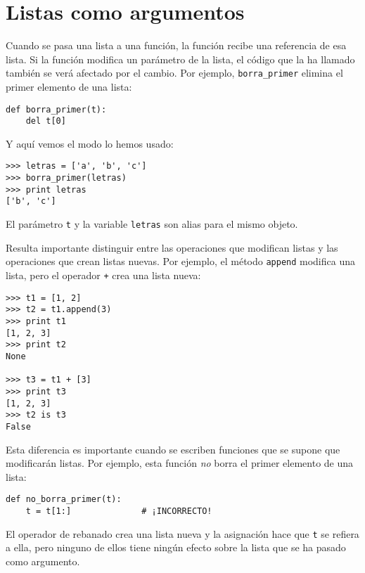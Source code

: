\section{Listas como argumentos}


Cuando se pasa una lista a una función, la función recibe una referencia
de esa lista.
Si la función modifica un parámetro de la lista, el código que la ha llamado también se verá afectado por el cambio.
Por ejemplo, \verb"borra_primer" elimina el primer elemento de una lista:

\beforeverb
\begin{verbatim}
def borra_primer(t):
    del t[0]
\end{verbatim}
\afterverb
%
Y aquí vemos el modo lo hemos usado:

\beforeverb
\begin{verbatim}
>>> letras = ['a', 'b', 'c']
>>> borra_primer(letras)
>>> print letras
['b', 'c']
\end{verbatim}
\afterverb
%
El parámetro {\tt t} y la variable {\tt letras} son
alias para el mismo objeto.

Resulta importante distinguir entre las operaciones que
modifican listas y las operaciones que crean listas nuevas.
Por ejemplo, el método {\tt append} modifica una lista, pero el
operador {\tt +} crea una lista nueva:


\beforeverb
\begin{verbatim}
>>> t1 = [1, 2]
>>> t2 = t1.append(3)
>>> print t1
[1, 2, 3]
>>> print t2
None

>>> t3 = t1 + [3]
>>> print t3
[1, 2, 3]
>>> t2 is t3
False
\end{verbatim}
\afterverb

Esta diferencia es importante cuando se escriben funciones que
se supone que modificarán listas. Por ejemplo, esta función
\emph{no} borra el primer elemento de una lista:

\beforeverb
\begin{verbatim}
def no_borra_primer(t):
    t = t[1:]              # ¡INCORRECTO!
\end{verbatim}
\afterverb

El operador de rebanado crea una lista nueva y la asignación
hace que {\tt t} se refiera a ella, pero ninguno de ellos tiene ningún efecto
sobre la lista que se ha pasado como argumento.

